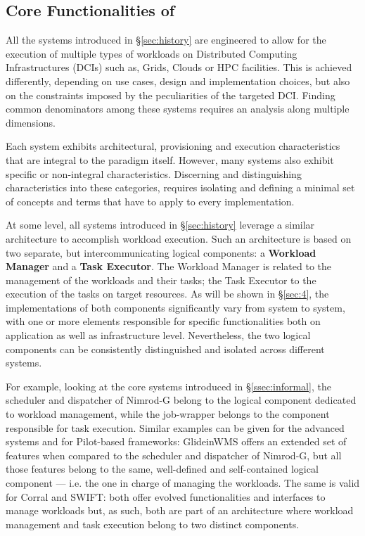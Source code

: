 \documentclass{sig-alternate}
\begin{document}
\subsection{Core Functionalities of \pilotjobs}
\label{subsec:vocab_core_functionalities}

All the \pilotjob systems introduced in \S\ref{sec:history} are engineered to
allow for the execution of multiple types of workloads on Distributed Computing
Infrastructures (DCIs) such as, Grids, Clouds or HPC facilities. This is
achieved differently, depending on use cases, design and implementation
choices, but also on the constraints imposed by the peculiarities of the
targeted DCI. Finding common denominators among these systems requires an
analysis along multiple dimensions.

Each \pilotjob system exhibits architectural, provisioning and execution
characteristics that are integral to the \pilotjob paradigm itself.
However, many \pilotjob systems also exhibit specific or non-integral
characteristics. Discerning and distinguishing characteristics into these
categories, requires isolating and defining a minimal set of concepts and terms
that have to apply to every \pilotjob implementation.

At some level, all \pilotjob systems introduced in \S\ref{sec:history} leverage
a similar architecture to accomplish workload execution. Such an architecture
is based on two separate, but intercommunicating logical components: a \textbf{ Workload
Manager} and a \textbf{Task Executor}. The Workload Manager is related to the
management of the workloads and their tasks; the Task Executor to the execution
of the tasks on target resources. As will be shown in \S\ref{sec:4}, the
implementations of both components significantly vary from system to system,
with one or more elements responsible for specific functionalities both on
application as well as infrastructure level. Nevertheless, the two logical
components can be consistently distinguished and isolated across different
\pilotjob systems.

For example, looking at the core \pilotjob systems introduced in
\S\ref{ssec:informal}, the scheduler and dispatcher of Nimrod-G belong to the
logical component dedicated to workload management, while the job-wrapper
belongs to the component responsible for task execution. Similar
examples can be given for the advanced \pilotjob systems and for Pilot-based
frameworks: GlideinWMS offers an extended set of features when compared to the
scheduler and dispatcher of Nimrod-G, but all those features belong to the
same, well-defined and self-contained logical component --- i.e. the one
in charge of managing the workloads. The same is valid for Corral and SWIFT:
both offer evolved functionalities and interfaces to manage workloads
but, as such, both are part of an architecture where workload management
and task execution belong to two distinct components.
\end{document}
